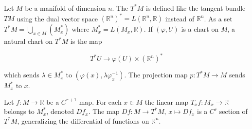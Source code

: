 Let $M$ be a manifold of dimension $n$. The  $T^*M$ is defined like the tangent bundle $TM$ using the dual vector space $(\mathbb{R}^n)^* = L(\mathbb{R}^n, \mathbb{R})$ instead of $\mathbb{R}^n$. As a set $T^*M = \bigcup_{x \in M} (M_x^*)$ where $M_x^* = L(M_x, \mathbb{R})$. If $(\varphi, U)$ is a chart on $M$, a natural chart on $T^*M$ is the map

$$T^*U \rightarrow \varphi(U) \times (\mathbb{R}^n)^*$$

which sends $\lambda \in M_x^*$ to $(\varphi(x), \lambda \varphi_x^{-1})$. The projection map $p: T^*M \rightarrow M$ sends $M_x^*$ to $x$.

Let $f: M \rightarrow \mathbb{R}$ be a $C^{r+1}$ map. For each $x \in M$ the linear map $T_x f: M_x \rightarrow \mathbb{R}$ belongs to $M_x^*$, denoted $Df_x$. The map $Df: M \rightarrow T^*M$, $x \mapsto Df_x$ is a $C^r$ section of $T^*M$, generalizing the differential of functions on $\mathbb{R}^n$.
